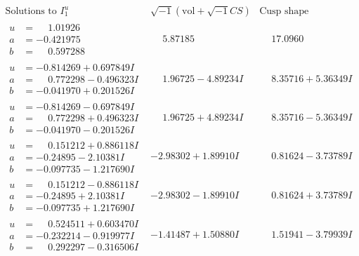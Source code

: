 \documentclass[1p]{elsarticle_modified}
\theoremstyle{definition}
\newcommand{\I}{\sqrt{-1}}
\begin{document}
$$\begin{array}{c|c|c}  
\text{Solutions to }I^u_{1}& \I (\text{vol} + \sqrt{-1}CS) & \text{Cusp shape}\\
 \hline 
\begin{aligned}
u &= \phantom{-}1.01926\phantom{ +0.000000I} \\
a &= -0.421975\phantom{ +0.000000I} \\
b &= \phantom{-}0.597288\phantom{ +0.000000I}\end{aligned}
 & \phantom{-}5.87185\phantom{ +0.000000I} & \phantom{-}17.0960\phantom{ +0.000000I} \\ \hline\begin{aligned}
u &= -0.814269 + 0.697849 I \\
a &= \phantom{-}0.772298 - 0.496323 I \\
b &= -0.041970 + 0.201526 I\end{aligned}
 & \phantom{-}1.96725 - 4.89234 I & \phantom{-}8.35716 + 5.36349 I \\ \hline\begin{aligned}
u &= -0.814269 - 0.697849 I \\
a &= \phantom{-}0.772298 + 0.496323 I \\
b &= -0.041970 - 0.201526 I\end{aligned}
 & \phantom{-}1.96725 + 4.89234 I & \phantom{-}8.35716 - 5.36349 I \\ \hline\begin{aligned}
u &= \phantom{-}0.151212 + 0.886118 I \\
a &= -0.24895 - 2.10381 I \\
b &= -0.097735 - 1.217690 I\end{aligned}
 & -2.98302 + 1.89910 I & \phantom{-}0.81624 - 3.73789 I \\ \hline\begin{aligned}
u &= \phantom{-}0.151212 - 0.886118 I \\
a &= -0.24895 + 2.10381 I \\
b &= -0.097735 + 1.217690 I\end{aligned}
 & -2.98302 - 1.89910 I & \phantom{-}0.81624 + 3.73789 I \\ \hline\begin{aligned}
u &= \phantom{-}0.524511 + 0.603470 I \\
a &= -0.232214 - 0.919977 I \\
b &= \phantom{-}0.292297 - 0.316506 I\end{aligned}
 & -1.41487 + 1.50880 I & \phantom{-}1.51941 - 3.79939 I \\ \hline\begin{aligned}

\end{aligned}
\end{array}$$
\end{document}
